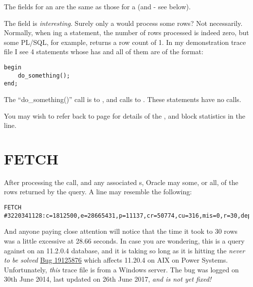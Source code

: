 The fields for an  are the same as those for a  (and  - see below).

The  field is \emph{interesting}. Surely only a  would process some rows? Not necessarily. Normally, when ing a statement, the number of rows processed is indeed zero, but some PL/SQL, for example, returns a row count of 1. In my demonstration trace file I see 4 statements whose  has  and all of them are of the format:

\begin{lstlisting}[caption={PL/SQL Exec Example}]
begin
    do_something();
end;
\end{lstlisting}

The ``do\_something()'' call is to ,  and calls to . These statements have no  calls.

You may wish to refer back to page \pageref{block-details} for details of the ,  and  block statistics in the  line.

\newpage\section{FETCH}\label{fetch}

After processing the  call, and any associated s, Oracle may  some, or all, of the rows returned by the query. A  line may resemble the following:

\begin{lstlisting}[numbers=none,caption={Fetch Line}]
FETCH #3220341128:c=1812500,e=28665431,p=11137,cr=50774,cu=316,mis=0,r=30,dep=0,og=1,plh=2215247290,tim=3520817271640
\end{lstlisting}

And anyone paying close attention will notice that the time it took to  30 rows was a little excessive at 28.66 seconds. In case you are wondering, this is a query against  on an 11.2.0.4 database, and it is taking so long as it is hitting the \emph{never to be solved} \href{https://support.oracle.com/epmos/faces/BugDisplay?_afrLoop=109163696075238\&id=19125876\&_afrWindowMode=0\&_adf.ctrl-state=9eq93xdtt_165}{Bug 19125876} which affects 11.20.4 on AIX on Power Systems. Unfortunately, \emph{this} trace file is from a Windows server. The bug was logged on 30th June 2014, last updated on 26th June 2017, \emph{and is not yet fixed!}


